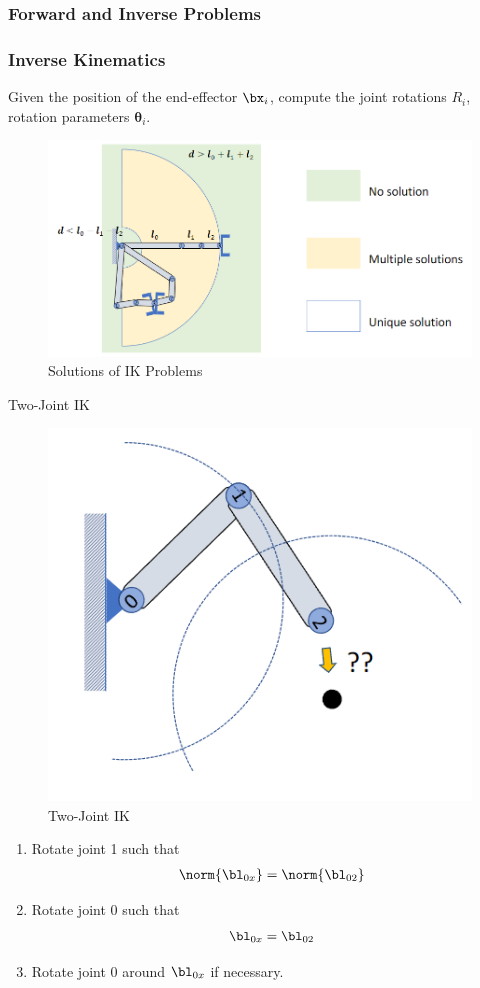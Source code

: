 \subsubsection{Forward and Inverse Problems}

\subsubsection{Inverse Kinematics}
Given the position of the end-effector $\bx_i$, compute the joint rotations $R_i$, rotation parameters $\bm{\theta}_i$.


\begin{figure}[!htb]
    \centering
    \includegraphics[width=0.618\linewidth]{pic/1053/Solutions of IK Problems}
    \caption{Solutions of IK Problems}
\end{figure}


\begin{example}
    Two-Joint IK
    \begin{figure}[!htb]
        \centering
        \includegraphics[width=0.618\linewidth]{pic/1053/Two-Joint IK}
        \caption{Two-Joint IK}
    \end{figure}
    
    \begin{enumerate}
        \item Rotate joint 1 such that
        \begin{align*}
            \norm{\bl_{0x}}=\norm{\bl_{02}}
        \end{align*}
        \item Rotate joint 0 such that
        \begin{align*}
            \bl_{0x}=\bl_{02}
        \end{align*}
        \item Rotate joint 0 around $\bl_{0x}$ if necessary.
    \end{enumerate}

\end{example}

